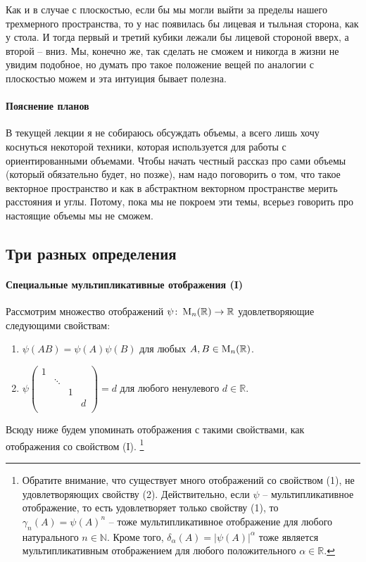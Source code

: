 Как и в случае с плоскостью, если бы мы могли выйти за пределы нашего трехмерного пространства, то у нас появилась бы лицевая и тыльная сторона, как у стола.
И тогда первый и третий кубики лежали бы лицевой стороной вверх, а второй -- вниз.
Мы, конечно же, так сделать не сможем и никогда в жизни не увидим подобное, но думать про такое положение вещей по аналогии с плоскостью можем и эта интуиция бывает полезна.

\paragraph{Пояснение планов}

В текущей лекции я не собираюсь обсуждать объемы, а всего лишь хочу коснуться некоторой техники, которая используется для работы с ориентированными объемами.
Чтобы начать честный рассказ про сами объемы (который обязательно будет, но позже), нам надо поговорить о том, что такое векторное пространство и как в абстрактном векторном пространстве мерить расстояния и углы.
Потому, пока мы не покроем эти темы, всерьез говорить про настоящие объемы мы не сможем.

\subsection{Три разных определения}

\paragraph{Специальные мультипликативные отображения (I)} 

Рассмотрим множество отображений $\psi\colon \operatorname{M}_{n}(\mathbb R)\to \mathbb R$ удовлетворяющие следующими свойствам:
\begin{enumerate}
\item $\psi(AB) = \psi(A)\psi(B)$ для любых $A,B\in\operatorname{M}_{n}(\mathbb R)$.

\item 
$
\psi
\begin{pmatrix}
{1}&{}&{}&{}\\
{}&{\ddots}&{}&{}\\
{}&{}&{1}&{}\\
{}&{}&{}&{d}\\
\end{pmatrix}
= 
d
$ для любого ненулевого $d\in\mathbb R$.
\end{enumerate}
Всюду ниже будем упоминать отображения с такими свойствами, как отображения со свойством (I).%
\footnote{Обратите внимание, что существует много отображений со свойством (1), не удовлетворяющих свойству (2).
Действительно, если $\psi$ -- мультипликативное отображение, то есть удовлетворяет только свойству (1), то $\gamma_n(A) = \psi(A)^n$ -- тоже мультипликативное отображение для любого натурального $n\in \mathbb N$.
Кроме того, $\delta_\alpha(A) = |\psi(A)|^\alpha$ тоже является мультипликативным отображением для любого положительного $\alpha\in \mathbb R$.}

